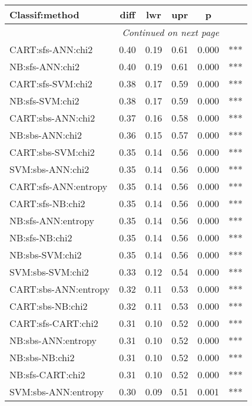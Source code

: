 \begin{center}
\begin{longtable}{|l|c|c|c|c|l}
\cline{1-5}
\textbf{Classif:method} & \textbf{diff} & \textbf{lwr} & \textbf{upr} & \textbf{p} & \\
\cline{1-5}
\endhead
\cline{1-5} \multicolumn{5}{r}{\textit{Continued on next page}} \\
\endfoot
\cline{1-5}
\endlastfoot
        CART:sfs-ANN:chi2 &   0.40 &   0.19 &   0.61 &  0.000 &  *** \\
          NB:sfs-ANN:chi2 &   0.40 &   0.19 &   0.61 &  0.000 &  *** \\
        CART:sfs-SVM:chi2 &   0.38 &   0.17 &   0.59 &  0.000 &  *** \\
          NB:sfs-SVM:chi2 &   0.38 &   0.17 &   0.59 &  0.000 &  *** \\
        CART:sbs-ANN:chi2 &   0.37 &   0.16 &   0.58 &  0.000 &  *** \\
          NB:sbs-ANN:chi2 &   0.36 &   0.15 &   0.57 &  0.000 &  *** \\
        CART:sbs-SVM:chi2 &   0.35 &   0.14 &   0.56 &  0.000 &  *** \\
         SVM:sbs-ANN:chi2 &   0.35 &   0.14 &   0.56 &  0.000 &  *** \\
     CART:sfs-ANN:entropy &   0.35 &   0.14 &   0.56 &  0.000 &  *** \\
         CART:sfs-NB:chi2 &   0.35 &   0.14 &   0.56 &  0.000 &  *** \\
       NB:sfs-ANN:entropy &   0.35 &   0.14 &   0.56 &  0.000 &  *** \\
           NB:sfs-NB:chi2 &   0.35 &   0.14 &   0.56 &  0.000 &  *** \\
          NB:sbs-SVM:chi2 &   0.35 &   0.14 &   0.56 &  0.000 &  *** \\
         SVM:sbs-SVM:chi2 &   0.33 &   0.12 &   0.54 &  0.000 &  *** \\
     CART:sbs-ANN:entropy &   0.32 &   0.11 &   0.53 &  0.000 &  *** \\
         CART:sbs-NB:chi2 &   0.32 &   0.11 &   0.53 &  0.000 &  *** \\
       CART:sfs-CART:chi2 &   0.31 &   0.10 &   0.52 &  0.000 &  *** \\
       NB:sbs-ANN:entropy &   0.31 &   0.10 &   0.52 &  0.000 &  *** \\
           NB:sbs-NB:chi2 &   0.31 &   0.10 &   0.52 &  0.000 &  *** \\
         NB:sfs-CART:chi2 &   0.31 &   0.10 &   0.52 &  0.000 &  *** \\
      SVM:sbs-ANN:entropy &   0.30 &   0.09 &   0.51 &  0.001 &  *** \\

\end{longtable}
\end{center}
